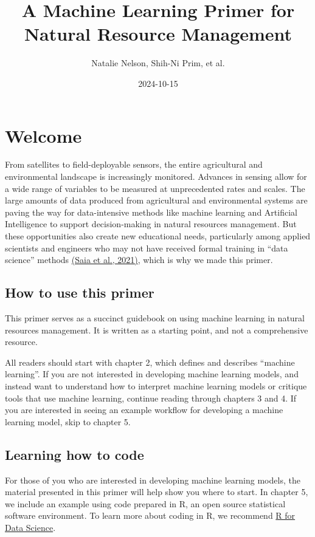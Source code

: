\documentclass[
]{book}
\title{A Machine Learning Primer for Natural Resource Management}
\author{Natalie Nelson, Shih-Ni Prim, et al.}
\date{2024-10-15}
\begin{document}
\maketitle

{
\setcounter{tocdepth}{1}
\tableofcontents
}
\hypertarget{welcome}{%
\chapter{Welcome}\label{welcome}}

From satellites to field-deployable sensors, the entire agricultural and environmental landscape is increasingly monitored. Advances in sensing allow for a wide range of variables to be measured at unprecedented rates and scales. The large amounts of data produced from agricultural and environmental systems are paving the way for data-intensive methods like machine learning and Artificial Intelligence to support decision-making in natural resources management. But these opportunities also create new educational needs, particularly among applied scientists and engineers who may not have received formal training in ``data science'' methods \href{https://doi.org/10.1016/j.ecolmodel.2020.109257}{(Saia et al., 2021)}, which is why we made this primer.

\hypertarget{how-to-use-this-primer}{%
\section{How to use this primer}\label{how-to-use-this-primer}}

This primer serves as a succinct guidebook on using machine learning in natural resources management. It is written as a starting point, and not a comprehensive resource.

All readers should start with chapter 2, which defines and describes ``machine learning''. If you are not interested in developing machine learning models, and instead want to understand how to interpret machine learning models or critique tools that use machine learning, continue reading through chapters 3 and 4. If you are interested in seeing an example workflow for developing a machine learning model, skip to chapter 5.

\hypertarget{learning-how-to-code}{%
\section{Learning how to code}\label{learning-how-to-code}}

For those of you who are interested in developing machine learning models, the material presented in this primer will help show you where to start. In chapter 5, we include an example using code prepared in R, an open source statistical software environment. To learn more about coding in R, we recommend \href{http://r4ds.hadley.nz/}{R for Data Science}.
\end{document}

